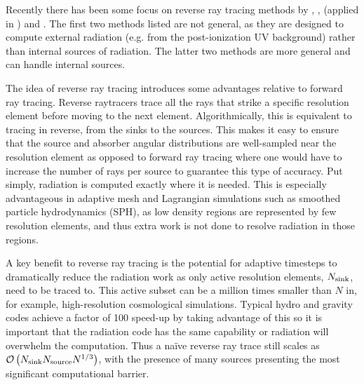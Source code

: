 \documentclass[fleq,usenatbib]{mnras}
\newcommand{\bigO}[1]{\mathcal{O}\left(#1\right)}
\newcommand{\NS}{N_{\rm source}}
\newcommand{\NK}{N_{\rm sink}}
\begin{document}
Recently there has been some focus on reverse ray tracing methods by
\cite{clarkEt12}, \cite{altayTheuns13}, \cite{Woods2015} (applied in 
\citealt{KannanEt14}) and \cite{HaidEt18}. The first two methods listed are 
not general, as they are designed to compute external radiation (e.g. from the 
post-ionization UV background) rather than internal sources of radiation.
The latter two methods are more general and can handle internal sources.

The idea of reverse ray tracing introduces some advantages relative 
to forward ray tracing. Reverse raytracers trace all the rays that strike
a specific resolution element before moving to the next element. 
Algorithmically, this is equivalent to tracing in reverse, from the sinks to 
the sources. This makes it easy to ensure that the source and absorber angular 
distributions are well-sampled near the resolution element as opposed to 
forward ray tracing where one would have to increase the number of rays per 
source to guarantee this type of accuracy. Put simply, radiation is computed 
exactly where it is needed.  This is especially advantageous in adaptive mesh 
and Lagrangian simulations such as smoothed particle hydrodynamics (SPH), as 
low density regions are represented by few resolution elements, and thus extra 
work is not done to resolve radiation in those regions.

A key benefit to reverse ray tracing is the potential for adaptive timesteps 
to dramatically reduce the radiation work as only active resolution elements, 
$\NK$, need to be traced to. This active subset can be a million times smaller 
than $N$ in, for example, high-resolution cosmological simulations. Typical 
hydro and gravity codes achieve a factor of 100 speed-up by taking advantage 
of this so it is important that the radiation code has the same capability or 
radiation will overwhelm the computation. Thus a na\"ive reverse ray trace 
still scales as $\bigO{\NK \NS N^{1/3}}$, with the presence of many sources 
presenting the most significant computational barrier.
\end{document}
